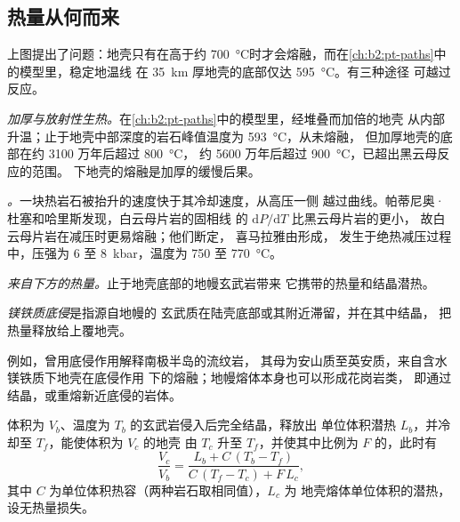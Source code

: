 \subsection*{热量从何而来}

上图提出了问题：地壳只有在高于约
\qty{700}{\celsius}时才会熔融，而在\cref{ch:b2:pt-paths}中的模型里，稳定地温线
在 \qty{35}{km} 厚地壳的底部仅达 \qty{595}{\celsius}。有三种途径
可越过反应。

\emph{加厚与放射性生热。}在\cref{ch:b2:pt-paths}中的模型里，经堆叠而加倍的地壳
从内部升温；止于地壳中部深度的岩石峰值温度为 \qty{593}{\celsius}，从未熔融，
但加厚地壳的底部在约 3100 万年后超过 \qty{800}{\celsius}，
约 5600 万年后超过 \qty{900}{\celsius}，已超出黑云母反应的范围。
下地壳的熔融是加厚的缓慢后果。

\emph{。}一块热岩石被抬升的速度快于其冷却速度，从高压一侧
越过曲线。帕蒂尼奥·杜塞和哈里斯发现，白云母片岩的固相线
的 $\mathrm{d}P/\mathrm{d}T$ 比黑云母片岩的更小，
故白云母片岩在减压时更易熔融；他们断定，
喜马拉雅由形成，
发生于绝热减压过程中，压强为 6 至 \qty{8}{kbar}，温度为 750 至 \qty{770}{\celsius}。

\emph{来自下方的热量。}止于地壳底部的地幔玄武岩带来
它携带的热量和结晶潜热。

\begin{definition}[镁铁质底侵]\label{def:b2:crustal-melting:underplating}
\emph{镁铁质底侵}是指源自地幔的
玄武质在陆壳底部或其附近滞留，并在其中结晶，
把热量释放给上覆地壳。
\end{definition}

例如，曾用底侵作用解释南极半岛的流纹岩，
其母为安山质至英安质，来自含水镁铁质下地壳在底侵作用
下的熔融；地幔熔体本身也可以形成花岗岩类，
即通过结晶，或重熔新近底侵的岩体。

\begin{proposition}[底侵的热量收支]\label{prop:b2:crustal-melting:heat}
体积为 $V_b$、温度为 $T_b$ 的玄武岩侵入后完全结晶，释放出
单位体积潜热 $L_b$，并冷却至 $T_f$，能使体积为 $V_c$ 的地壳
由 $T_c$ 升至 $T_f$，并使其中比例为 $F$ 的，此时有
\[\frac{V_c}{V_b} = \frac{L_b + C\,(T_b - T_f)}{C\,(T_f - T_c) + F\,L_c},\]
其中 $C$ 为单位体积热容（两种岩石取相同值），$L_c$ 为
地壳熔体单位体积的潜热，设无热量损失。
\end{proposition}

